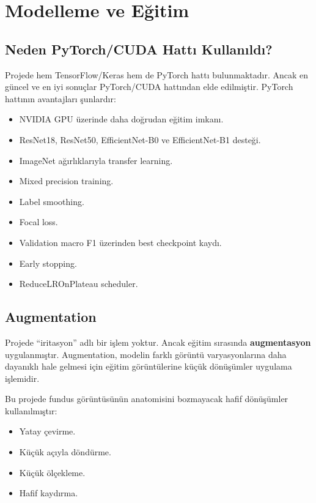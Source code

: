 \documentclass[12pt,a4paper]{article}
\begin{document}


\section{Modelleme ve Eğitim}

\subsection{Neden PyTorch/CUDA Hattı Kullanıldı?}

Projede hem TensorFlow/Keras hem de PyTorch hattı bulunmaktadır. Ancak en güncel ve en iyi sonuçlar PyTorch/CUDA hattından elde edilmiştir. PyTorch hattının avantajları şunlardır:

\begin{itemize}
    \item NVIDIA GPU üzerinde daha doğrudan eğitim imkanı.
    \item ResNet18, ResNet50, EfficientNet-B0 ve EfficientNet-B1 desteği.
    \item ImageNet ağırlıklarıyla transfer learning.
    \item Mixed precision training.
    \item Label smoothing.
    \item Focal loss.
    \item Validation macro F1 üzerinden best checkpoint kaydı.
    \item Early stopping.
    \item ReduceLROnPlateau scheduler.
\end{itemize}

\subsection{Augmentation}

Projede ``iritasyon'' adlı bir işlem yoktur. Ancak eğitim sırasında \textbf{augmentasyon} uygulanmıştır. Augmentation, modelin farklı görüntü varyasyonlarına daha dayanıklı hale gelmesi için eğitim görüntülerine küçük dönüşümler uygulama işlemidir.

Bu projede fundus görüntüsünün anatomisini bozmayacak hafif dönüşümler kullanılmıştır:

\begin{itemize}
    \item Yatay çevirme.
    \item Küçük açıyla döndürme.
    \item Küçük ölçekleme.
    \item Hafif kaydırma.
\end{itemize}
\end{document}

